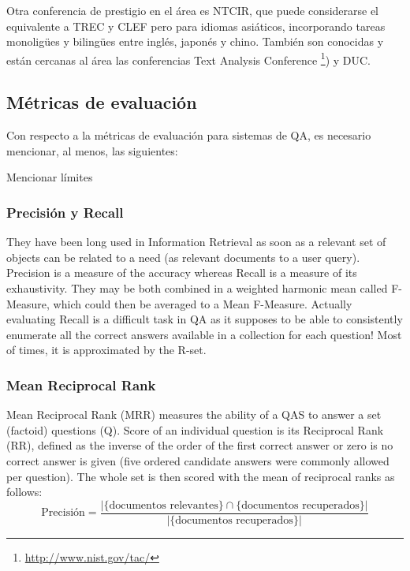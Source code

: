 Otra conferencia de prestigio en el área es NTCIR, que puede considerarse el equivalente a TREC y CLEF pero para idiomas asiáticos, incorporando tareas monoligües y bilingües entre inglés, japonés y chino. También son conocidas y están cercanas al área las conferencias Text Analysis Conference \footnote{\url{http://www.nist.gov/tac/}}) y DUC. 


\subsection{Métricas de evaluación}
\label{subsec:metricas}


Con respecto a la métricas de evaluación para sistemas de QA, es necesario mencionar, al menos, las siguientes:

{\color{red}Mencionar límites}
\subsubsection*{Precisión y Recall}
They have been long used in Information Retrieval as soon as a relevant set of objects can 
be related to a need (as relevant documents to a user query). Precision is a measure of the accuracy whereas Recall is a 
measure of its exhaustivity. They may be both combined in a  weighted harmonic mean called F-Measure, which could then 
be averaged to a Mean F-Measure.  Actually evaluating Recall is a difficult task in QA as it  supposes to be able to consistently enumerate all the correct  answers available in a collection for each question! Most of times, it is approximated by the R-set. 

\subsubsection*{Mean Reciprocal Rank}
 

Mean Reciprocal Rank (MRR) measures the ability of a QAS to answer a set (factoid) 
questions (Q). Score of an individual question is its Reciprocal Rank (RR), defined as the inverse of the order of 
the first correct answer or zero is no correct answer is given (five ordered candidate answers were commonly allowed per 
question). The whole set is then scored with the mean of reciprocal ranks as follows: 
\begin{equation}\label{eq:precision}
 \mbox{Precisión}=\frac{|\{\mbox{documentos relevantes}\}\cap\{\mbox{documentos recuperados}\}|}{|\{\mbox{documentos recuperados}\}|} 
\end{equation}

